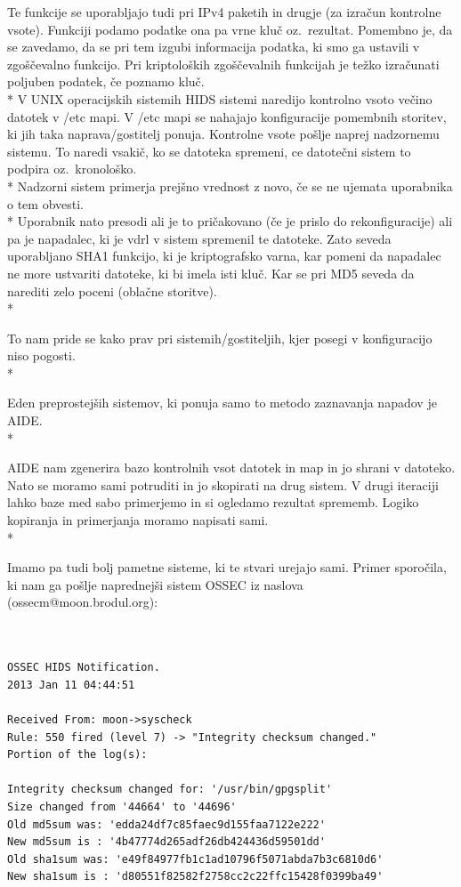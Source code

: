 \documentclass[12pt]{article}
\begin{document}
Te funkcije se uporabljajo tudi pri IPv4 paketih in drugje (za izračun kontrolne vsote). Funkciji podamo podatke ona pa vrne kluč oz.\ rezultat.
Pomembno je, da se zavedamo, da se pri tem izgubi informacija podatka, ki smo ga ustavili v zgoščevalno funkcijo.
Pri kriptoloških zgoščevalnih funkcijah je težko izračunati poljuben podatek, če poznamo kluč.
\\*
V UNIX operacijskih sistemih HIDS sistemi naredijo kontrolno vsoto večino datotek v /etc mapi. V /etc mapi se nahajajo konfiguracije pomembnih storitev, ki jih taka naprava/gostitelj ponuja.
Kontrolne vsote pošlje naprej nadzornemu sistemu. To naredi vsakič, ko se datoteka spremeni, ce datotečni sistem to podpira oz.\ kronološko.
\\*
Nadzorni sistem primerja prejšno vrednost z novo, če se ne ujemata uporabnika o tem obvesti.
\\*
Uporabnik nato presodi ali je to pričakovano (če je prislo do rekonfiguracije) ali pa je napadalec, ki je vdrl v sistem spremenil te datoteke.
Zato seveda uporabljano SHA1 funkcijo, ki je kriptografsko varna, kar pomeni da napadalec ne more ustvariti datoteke, ki bi imela isti kluč. Kar se pri MD5 seveda da narediti zelo poceni (oblačne storitve).
\\*

To nam pride se kako prav pri sistemih/gostiteljih, kjer posegi v konfiguracijo niso pogosti.
\\*

Eden preprostejših sistemov, ki ponuja samo to metodo zaznavanja napadov je AIDE\cite{aide}.
\\*

AIDE nam zgenerira bazo kontrolnih vsot datotek in map in jo shrani v datoteko. Nato se moramo sami potruditi in jo skopirati na drug sistem. V drugi iteraciji lahko baze med sabo primerjemo in si ogledamo rezultat sprememb.
Logiko kopiranja in primerjanja moramo napisati sami.
\\*

Imamo pa tudi bolj pametne sisteme, ki te stvari urejajo sami.
Primer sporočila, ki nam ga pošlje naprednejši sistem OSSEC iz naslova (ossecm@moon.brodul.org):

\begin{verbatim}


OSSEC HIDS Notification.
2013 Jan 11 04:44:51

Received From: moon->syscheck
Rule: 550 fired (level 7) -> "Integrity checksum changed."
Portion of the log(s):

Integrity checksum changed for: '/usr/bin/gpgsplit'
Size changed from '44664' to '44696'
Old md5sum was: 'edda24df7c85faec9d155faa7122e222'
New md5sum is : '4b47774d265adf26db424436d59501dd'
Old sha1sum was: 'e49f84977fb1c1ad10796f5071abda7b3c6810d6'
New sha1sum is : 'd80551f82582f2758cc2c22ffc15428f0399ba49'

\end{verbatim}
\end{document}
